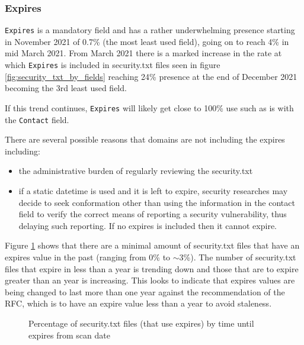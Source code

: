 \documentclass{mscreport}
\begin{document}
\subsubsection{Expires}

\noindent
\texttt{Expires} is a mandatory field and has a rather underwhelming presence starting in November 2021 of 0.7\% (the most least used field), going on to reach 4\% in mid March 2021. From March 2021 there is a marked increase in the rate at which \texttt{Expires} is included in security.txt files seen in figure \ref{fig:security_txt_by_fields} reaching 24\% presence at the end of December 2021 becoming the 3rd least used field.

\vspace{0.3cm} \noindent
If this trend continues, \texttt{Expires} will likely get close to 100\% use such as is with the \texttt{Contact} field.

\vspace{0.3cm} \noindent
There are several possible reasons that domains are not including the expires including:
\begin{itemize}
	\setlength\itemsep{0.01em}
    \item the administrative burden of regularly reviewing the security.txt
    \item if a static datetime is used and it is left to expire, security researches may decide to seek conformation other than using the information in the contact field to verify the correct means of reporting a security vulnerability, thus delaying such reporting. If no expires is included then it cannot expire.
\end{itemize}


\noindent
Figure \ref{fig:security_txt_by_when_expires} shows that there are a minimal amount of security.txt files that have an expires value in the past (ranging from 0\% to $\sim$3\%). The number of security.txt files that expire in less than a year is trending down and those that are to expire greater than an year is increasing. This looks to indicate that expires values are being changed to last more than one year against the recommendation of the RFC, which is to have an expire value less than a year to avoid staleness.

\clearpage
\newpage

\begin{figure}[t]
	\begin{center}
		\caption{Percentage of security.txt files (that use expires) by time until expires from scan date}
		\label{fig:security_txt_by_when_expires}
	\end{center}
\end{figure}
\end{document}
